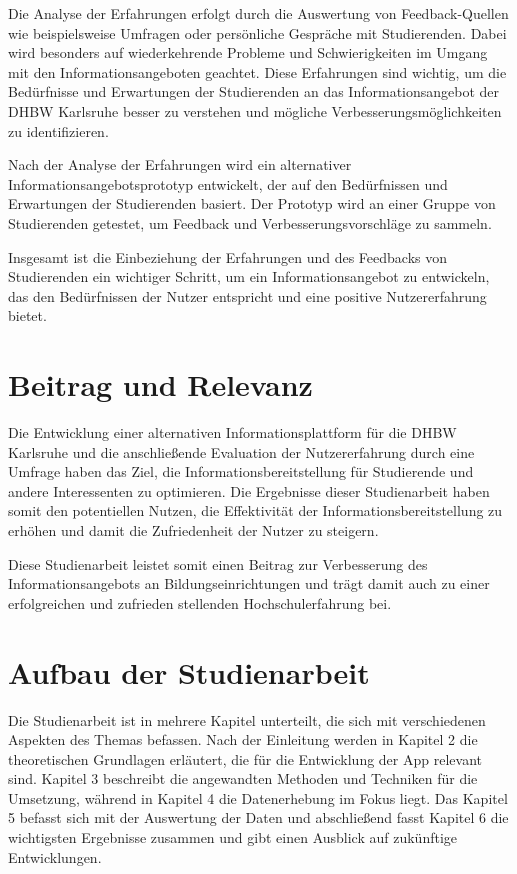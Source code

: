 Die Analyse der Erfahrungen erfolgt durch die Auswertung von Feedback-Quellen wie beispielsweise Umfragen oder persönliche Gespräche mit Studierenden. Dabei wird besonders auf wiederkehrende Probleme und Schwierigkeiten im Umgang mit den Informationsangeboten geachtet. Diese Erfahrungen sind wichtig, um die Bedürfnisse und Erwartungen der Studierenden an das Informationsangebot der DHBW Karlsruhe besser zu verstehen und mögliche Verbesserungsmöglichkeiten zu identifizieren.

Nach der Analyse der Erfahrungen wird ein alternativer Informationsangebotsprototyp entwickelt, der auf den Bedürfnissen und Erwartungen der Studierenden basiert. Der Prototyp wird an einer Gruppe von Studierenden getestet, um Feedback und Verbesserungsvorschläge zu sammeln.

Insgesamt ist die Einbeziehung der Erfahrungen und des Feedbacks von Studierenden ein wichtiger Schritt, um ein Informationsangebot zu entwickeln, das den Bedürfnissen der Nutzer entspricht und eine positive Nutzererfahrung bietet.


\section{Beitrag und Relevanz}
Die Entwicklung einer alternativen Informationsplattform für die DHBW Karlsruhe und die anschließende Evaluation der Nutzererfahrung durch eine Umfrage haben das Ziel, die Informationsbereitstellung für Studierende und andere Interessenten zu optimieren. Die Ergebnisse dieser Studienarbeit haben somit den potentiellen Nutzen, die Effektivität der Informationsbereitstellung zu erhöhen und damit die Zufriedenheit der Nutzer zu steigern.

Diese Studienarbeit leistet somit einen Beitrag zur Verbesserung des Informationsangebots an Bildungseinrichtungen und trägt damit auch zu einer erfolgreichen und zufrieden stellenden Hochschulerfahrung bei.
\newpage

\section{Aufbau der Studienarbeit}
Die Studienarbeit ist in mehrere Kapitel unterteilt, die sich mit verschiedenen Aspekten des Themas befassen. Nach der Einleitung werden in Kapitel 2 die theoretischen Grundlagen erläutert, die für die Entwicklung der App relevant sind. Kapitel 3 beschreibt die angewandten Methoden und Techniken für die Umsetzung, während in Kapitel 4 die Datenerhebung im Fokus liegt. Das Kapitel 5 befasst sich mit der Auswertung der Daten und abschließend fasst Kapitel 6 die wichtigsten Ergebnisse zusammen und gibt einen Ausblick auf zukünftige Entwicklungen.
